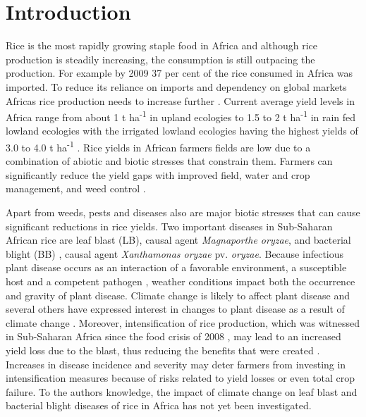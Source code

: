 \documentclass[preprint,12pt]{elsarticle}
\begin{document}
\section{Introduction}
Rice is the most rapidly growing staple food in Africa and although rice production is steadily increasing, the consumption is still outpacing the production. For example by 2009 37 per cent of the rice consumed in Africa was imported. To reduce its reliance on imports and dependency on global markets Africas rice production needs to increase further \cite{Seck2013}. Current average yield levels in Africa range from about 1 t ha\textsuperscript{-1} in upland ecologies to 1.5 to 2 t ha\textsuperscript{-1} in rain fed lowland ecologies with the irrigated lowland ecologies having the highest yields of 3.0 to 4.0 t ha\textsuperscript{-1} \cite{Diagne2013}. Rice yields in African farmers fields are low due to a combination of abiotic and biotic stresses that constrain them. Farmers can significantly reduce the yield gaps with improved field, water and crop management, and weed control \cite{Saito2013}.

Apart from weeds, pests and diseases also are major biotic stresses that can cause significant reductions in rice yields. Two important diseases in Sub-Saharan African rice are leaf blast (LB), causal agent \textit{Magnaporthe oryzae}, and bacterial blight (BB) \cite{Verdier2012}, causal agent \textit{Xanthamonas oryzae} pv. \textit{oryzae}. Because infectious plant disease occurs as an interaction of a favorable environment, a susceptible host and a competent pathogen \cite{Madden2007}, weather conditions impact both the occurrence and gravity of plant disease. Climate change is likely to affect plant disease \cite{Anderson2004, Coakley1999, Garrett2006} and several others have expressed interest in changes to plant disease as a result of climate change \cite{Chakraborty2011, Juroszek2011, Luck2011, Pautasso2010, Savary2011, Sutherst2011}. Moreover, intensification of rice production, which was witnessed in Sub-Saharan Africa since the food crisis of 2008 \cite{Saito2013}, may lead to an increased yield loss due to the blast, thus reducing the benefits that were created \cite{Sere2013}. Increases in disease incidence and severity may deter farmers from investing in intensification measures because of risks related to yield losses or even total crop failure. To the authors knowledge, the impact of climate change on leaf blast and bacterial blight diseases of rice in Africa has not yet been investigated.
\end{document}
